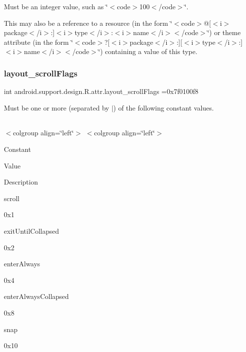 Must be an integer value, such as \char`\"{}$<$code$>$100$<$/code$>$\char`\"{}. 

This may also be a reference to a resource (in the form \char`\"{}$<$code$>$@\mbox{[}$<$i$>$package$<$/i$>$\+:\mbox{]}$<$i$>$type$<$/i$>$\+:$<$i$>$name$<$/i$>$$<$/code$>$\char`\"{}) or theme attribute (in the form \char`\"{}$<$code$>$?\mbox{[}$<$i$>$package$<$/i$>$\+:\mbox{]}\mbox{[}$<$i$>$type$<$/i$>$\+:\mbox{]}$<$i$>$name$<$/i$>$$<$/code$>$\char`\"{}) containing a value of this type. \mbox{\label{classandroid_1_1support_1_1design_1_1R_1_1attr_ac74bc2945ca7301db9b32f08c4454a7d}} 
\subsubsection{\texorpdfstring{layout\+\_\+scroll\+Flags}{layout\_scrollFlags}}
{\footnotesize\ttfamily int android.\+support.\+design.\+R.\+attr.\+layout\+\_\+scroll\+Flags =0x7f0100f8\hspace{0.3cm}{\ttfamily [static]}}

Must be one or more (separated by \textquotesingle{}$\vert$\textquotesingle{}) of the following constant values.

\tabulinesep=1mm
\begin{longtabu} spread 0pt [c]{*{0}{|X[-1]}|}
\hline
\end{longtabu}
$<$colgroup align=\char`\"{}left\char`\"{}$>$ $<$colgroup align=\char`\"{}left\char`\"{}$>$ 

Constant

Value

Description 

{\ttfamily scroll}

0x1

{\ttfamily exit\+Until\+Collapsed}

0x2

{\ttfamily enter\+Always}

0x4

{\ttfamily enter\+Always\+Collapsed}

0x8

{\ttfamily snap}

0x10\mbox{\label{classandroid_1_1support_1_1design_1_1R_1_1attr_ac4c1f8078558d24685155a3802d0746f}} 
